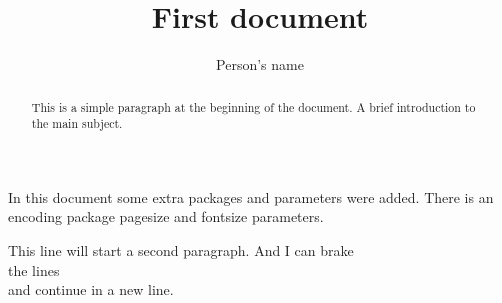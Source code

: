 \documentclass{report}
\begin{document}
 
\title{First document}
\author{Person's name}

\begin{titlepage}
\maketitle
\end{titlepage}

\begin{abstract}
This is a simple paragraph at the beginning of the document. A brief introduction to the main subject.
\end{abstract}
 
In this document some extra packages and parameters
were added. There is an encoding package
pagesize and fontsize parameters.
 
This line will start a second paragraph. And I can
 brake\\ the lines \\ and continue in a new line.
 
\end{document}
